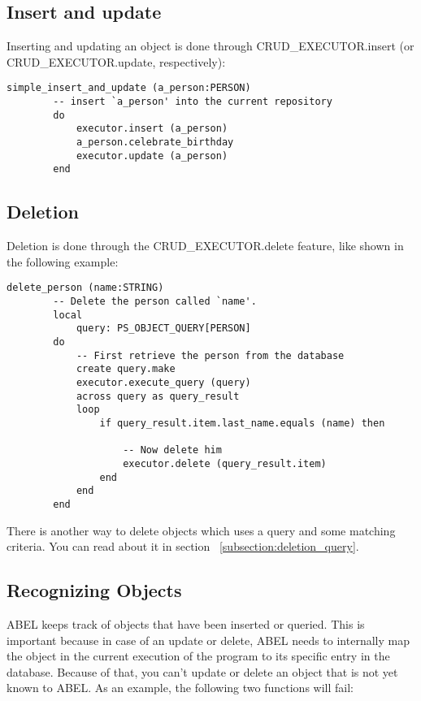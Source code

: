 \subsection{Insert and update}

Inserting and updating an object is done through CRUD\_EXECUTOR.insert (or CRUD\_EXECUTOR.update, respectively): 

\begin{lstlisting}[language=OOSC2Eiffel, captionpos=b, caption={}, label={lst:simple_insert}]
	simple_insert_and_update (a_person:PERSON)
		-- insert `a_person' into the current repository
		do
			executor.insert (a_person)
			a_person.celebrate_birthday
			executor.update (a_person)
		end
\end{lstlisting}


\subsection{Deletion}
\label{subsection:simple_delete}

Deletion is done through the CRUD\_EXECUTOR.delete feature, like shown in the following example:

\begin{lstlisting}[language=OOSC2Eiffel, captionpos=b, caption={}, label={lst:simple_delete}]
	delete_person (name:STRING)
		-- Delete the person called `name'.
		local
			query: PS_OBJECT_QUERY[PERSON]
		do
			-- First retrieve the person from the database
			create query.make
			executor.execute_query (query)
			across query as query_result
			loop
				if query_result.item.last_name.equals (name) then

					-- Now delete him
					executor.delete (query_result.item)
				end
			end
		end
\end{lstlisting}

There is another way to delete objects which uses a query and some matching criteria. 
You can read about it in section ~\ref{subsection:deletion_query}.

\subsection{Recognizing Objects}
\label{subsection:recognize_objects}

ABEL keeps track of objects that have been inserted or queried.
This is important because in case of an update or delete, ABEL needs to internally map the object in the current execution of the program to its specific entry in the database.
Because of that, you can't update or delete an object that is not yet known to ABEL.
As an example, the following two functions will fail:

